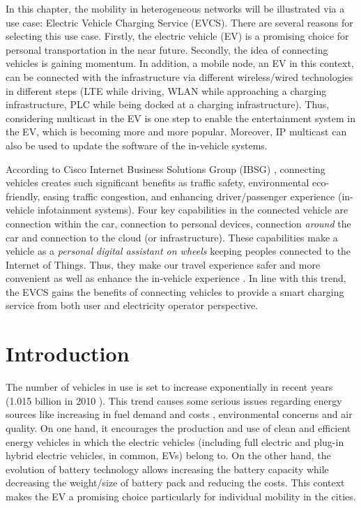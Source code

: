 In this chapter, the mobility in heterogeneous networks will be illustrated via a use case: Electric Vehicle Charging Service (EVCS). There are several reasons for selecting this use case. Firstly, the electric vehicle (EV) is a promising choice for personal transportation in the near future. Secondly, the idea of connecting vehicles is gaining momentum. In addition, a mobile node, an EV in this context, can be connected with the infrastructure via different wireless/wired technologies in different steps (LTE while driving, WLAN while approaching a charging infrastructure, PLC while being docked at a charging infrastructure). Thus, considering multicast in the EV is one step to enable the entertainment system in the EV, which is becoming more and more popular. Moreover, IP multicast can also be used to update the software of the in-vehicle systems.

According to Cisco Internet Business Solutions Group (IBSG) \cite{IBSG_connected_vehicle}, connecting vehicles creates such significant benefits as traffic safety, environmental eco-friendly, easing traffic congestion, and enhancing driver/passenger experience (in-vehicle infotainment systems). Four key capabilities in the connected vehicle are connection within the car, connection to personal devices, connection \textit{around} the car and connection to the cloud (or infrastructure). These capabilities make a vehicle as a \textit{personal digital assistant on wheels} \cite{IBSG_connected_vehicle2} keeping peoples connected to the Internet of Things. Thus, they make our travel experience safer and more convenient as well as enhance the in-vehicle experience \cite{IBSG_connected_vehicle2}. In line with this trend, the EVCS gains the benefits of connecting vehicles to provide a smart charging service from both user and electricity operator perspective. 

\section{Introduction}
The number of vehicles in use is set to increase exponentially in recent years (1.015 billion in 2010 \cite{vehicle_population}). This trend causes some serious issues regarding energy sources like increasing in fuel demand and costs \cite{evci_mit}, environmental concerns \cite{gas_emission} and air quality. On one hand, it encourages the production and use of clean and efficient energy vehicles in which the electric vehicles (including full electric and plug-in hybrid electric vehicles, in common, EVs) belong to. On the other hand, the evolution of battery technology allows increasing the battery capacity while decreasing the weight/size of battery pack and reducing the costs. This context makes the EV a promising choice particularly for individual mobility in the cities.

